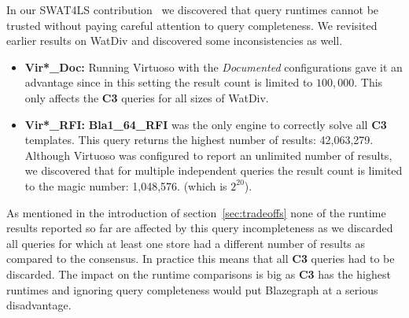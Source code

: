
In our SWAT4LS contribution~\cite{dewitte_swat4ls_2016} we discovered that query runtimes cannot be trusted without paying careful attention to query completeness. We revisited earlier results on WatDiv and discovered some inconsistencies as well.
\begin{itemize}
	\item \textbf{Vir*\_Doc:} Running Virtuoso with the \emph{Documented} configurations gave it an advantage since in this setting the result count is limited to $100,000$. This only affects the \textbf{C3} queries for all sizes of WatDiv.
	\item \textbf{Vir*\_RFI:} \textbf{Bla1\_64\_RFI} was the only engine to correctly solve all \textbf{C3} templates. This query returns the highest number of results: 42,063,279. Although Virtuoso was configured to report an unlimited number of results, we discovered that for multiple independent queries the result count is limited to the magic number: 1,048,576. (which is $2^{20}$).  
\end{itemize}
As mentioned in the introduction of section~\ref{sec:tradeoffs} none of the runtime results reported so far are affected by this query incompleteness as we discarded all queries for which at least one store had a different number of results as compared to the consensus. In practice this means that all \textbf{C3} queries had to be discarded. The impact on the runtime comparisons is big as \textbf{C3} has the highest runtimes and ignoring query completeness would put Blazegraph at a serious disadvantage.
